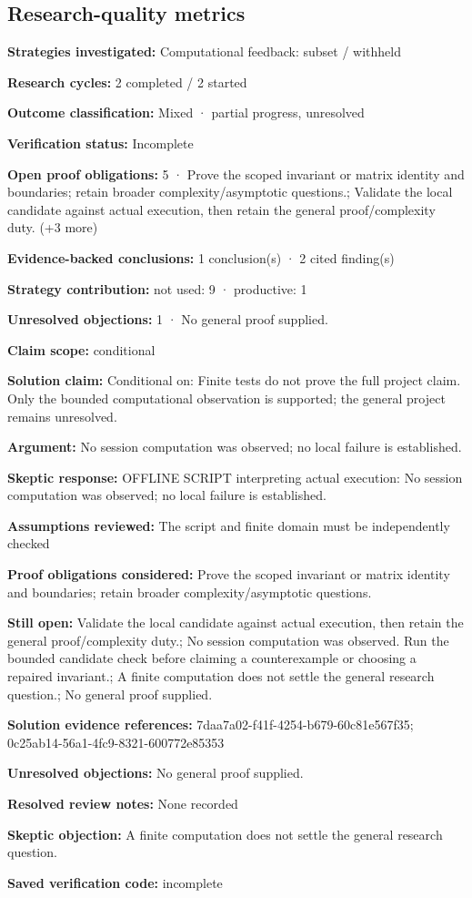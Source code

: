 \documentclass[11pt]{article}
\begin{document}
\subsection{Research-quality metrics}
\textbf{Strategies investigated:} Computational feedback: subset / withheld\par
\textbf{Research cycles:} 2 completed / 2 started\par
\textbf{Outcome classification:} Mixed · partial progress, unresolved\par
\textbf{Verification status:} Incomplete\par
\textbf{Open proof obligations:} 5 · Prove the scoped invariant or matrix identity and boundaries; retain broader complexity/asymptotic questions.; Validate the local candidate against actual execution, then retain the general proof/complexity duty. (+3 more)\par
\textbf{Evidence-backed conclusions:} 1 conclusion(s) · 2 cited finding(s)\par
\textbf{Strategy contribution:} not used: 9 · productive: 1\par
\textbf{Unresolved objections:} 1 · No general proof supplied.\par
\textbf{Claim scope:} conditional\par
\textbf{Solution claim:} Conditional on: Finite tests do not prove the full project claim. Only the bounded computational observation is supported; the general project remains unresolved.\par
\textbf{Argument:} No session computation was observed; no local failure is established.\par
\textbf{Skeptic response:} OFFLINE SCRIPT interpreting actual execution: No session computation was observed; no local failure is established.\par
\textbf{Assumptions reviewed:} The script and finite domain must be independently checked\par
\textbf{Proof obligations considered:} Prove the scoped invariant or matrix identity and boundaries; retain broader complexity/asymptotic questions.\par
\textbf{Still open:} Validate the local candidate against actual execution, then retain the general proof/complexity duty.; No session computation was observed. Run the bounded candidate check before claiming a counterexample or choosing a repaired invariant.; A finite computation does not settle the general research question.; No general proof supplied.\par
\textbf{Solution evidence references:} 7daa7a02-f41f-4254-b679-60c81e567f35; 0c25ab14-56a1-4fc9-8321-600772e85353\par
\textbf{Unresolved objections:} No general proof supplied.\par
\textbf{Resolved review notes:} None recorded\par
\textbf{Skeptic objection:} A finite computation does not settle the general research question.\par
\textbf{Saved verification code:} incomplete\par
\end{document}
